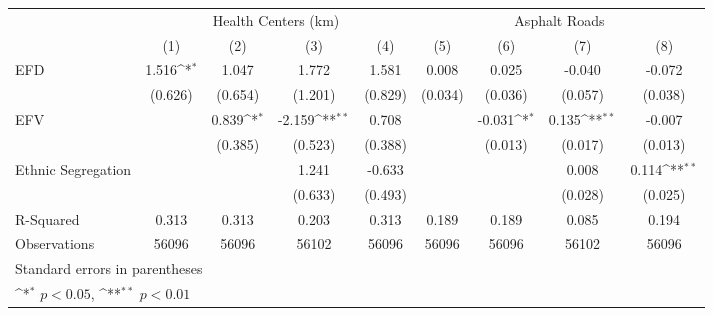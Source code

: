 {
\def\sym#1{\ifmmode^{#1}\else\(^{#1}\)\fi}
\begin{tabular}{l*{8}{c}}
\toprule
                    &\multicolumn{4}{c}{Health Centers (km)}                                            &\multicolumn{4}{c}{Asphalt Roads}                                                  \\\cmidrule(lr){2-5}\cmidrule(lr){6-9}
                    &\multicolumn{1}{c}{(1)}        &\multicolumn{1}{c}{(2)}        &\multicolumn{1}{c}{(3)}        &\multicolumn{1}{c}{(4)}        &\multicolumn{1}{c}{(5)}        &\multicolumn{1}{c}{(6)}        &\multicolumn{1}{c}{(7)}        &\multicolumn{1}{c}{(8)}        \\
\midrule
EFD                 &       1.516\sym{*} &       1.047        &       1.772        &       1.581        &       0.008        &       0.025        &      -0.040        &      -0.072        \\
                    &     (0.626)        &     (0.654)        &     (1.201)        &     (0.829)        &     (0.034)        &     (0.036)        &     (0.057)        &     (0.038)        \\
EFV                 &                    &       0.839\sym{*} &      -2.159\sym{**}&       0.708        &                    &      -0.031\sym{*} &       0.135\sym{**}&      -0.007        \\
                    &                    &     (0.385)        &     (0.523)        &     (0.388)        &                    &     (0.013)        &     (0.017)        &     (0.013)        \\
Ethnic Segregation  &                    &                    &       1.241        &      -0.633        &                    &                    &       0.008        &       0.114\sym{**}\\
                    &                    &                    &     (0.633)        &     (0.493)        &                    &                    &     (0.028)        &     (0.025)        \\
\midrule
R-Squared           &\multicolumn{1}{c}{0.313}        &\multicolumn{1}{c}{0.313}        &\multicolumn{1}{c}{0.203}        &\multicolumn{1}{c}{0.313}        &\multicolumn{1}{c}{0.189}        &\multicolumn{1}{c}{0.189}        &\multicolumn{1}{c}{0.085}        &\multicolumn{1}{c}{0.194}        \\
Observations        &\multicolumn{1}{c}{56096}        &\multicolumn{1}{c}{56096}        &\multicolumn{1}{c}{56102}        &\multicolumn{1}{c}{56096}        &\multicolumn{1}{c}{56096}        &\multicolumn{1}{c}{56096}        &\multicolumn{1}{c}{56102}        &\multicolumn{1}{c}{56096}        \\
\bottomrule
\multicolumn{9}{l}{\footnotesize Standard errors in parentheses}\\
\multicolumn{9}{l}{\footnotesize \sym{*} \(p<0.05\), \sym{**} \(p<0.01\)}\\
\end{tabular}
}
